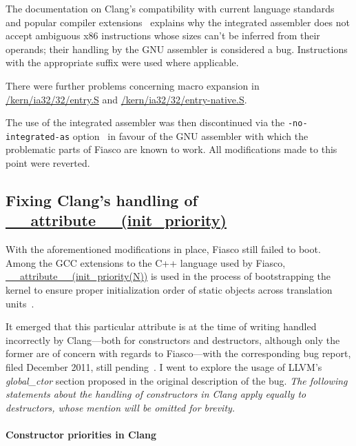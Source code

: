 The documentation on Clang's compatibility with current language standards and
popular compiler extensions~\cite[Inline assembly]{clang-compatibility}
explains why the integrated assembler does not accept ambiguous x86
instructions whose sizes can't be inferred from their operands; their handling
by the GNU assembler is considered a bug. Instructions with the appropriate
suffix were used where applicable.

There were further problems concerning macro expansion in
\url{/kern/ia32/32/entry.S} and \url{/kern/ia32/32/entry-native.S}.

The use of the integrated assembler was then discontinued via the
\texttt{-no-integrated-as} option~\cite{manclang} in favour of the GNU
assembler with which the problematic parts of Fiasco are known to work.
All modifications made to this point were reverted.

\subsection{Fixing Clang's handling of \url{\_\_attribute\_\_(init\_priority)}}

With the aforementioned modifications in place, Fiasco still failed to boot. Among the GCC extensions
to the C++ language used by Fiasco,
\url{\_\_attribute\_\_(init\_priority(N))} is used
in the process of bootstrapping the
kernel to ensure proper initialization order of static objects across
translation units~\cite{gcc-initpriority}.

It emerged
that this particular attribute is at the time of writing handled incorrectly by
Clang—both for constructors and destructors, although only the former are of concern with regards to Fiasco—with the corresponding
bug report, filed December 2011, still pending~\cite{initpriority-bug}. I went
to explore the usage of LLVM's \emph{global\_ctor} section proposed in the
original description of the bug. \emph{The following statements
about the handling of constructors in Clang apply equally
to destructors, whose mention will be omitted for brevity.}


\paragraph{Constructor priorities in Clang}

